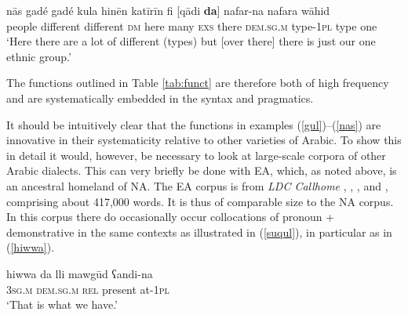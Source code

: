 \documentclass[output=paper]{langsci/langscibook}
\begin{document}
\ea\label{nas}
\gll nās gadé gadé kula hinēn katīrīn fi [qādi \textbf{da}] nafar-na nafara wāhid\\
     people different different \textsc{dm} here many \textsc{exs} there \textsc{dem.sg.m} type-\textsc{1pl} type one\\
\glt ‘Here there are a lot of different (types) but [over there] there is just our one ethnic group.’
\z

The functions outlined in Table \ref{tab:funct} are therefore both of high frequency and are systematically embedded in the syntax and pragmatics.

It should be intuitively clear that the functions in examples (\ref{gul})–(\ref{nas}) are innovative in their systematicity relative to other varieties of Arabic. To show this in detail it would, however, be necessary to look at large-scale corpora of other Arabic dialects. This can very briefly be done with EA, which, as noted above, is an ancestral homeland of NA. The EA corpus is from \textit{LDC Callhome} \citep{Canavanetal1997}, \citet{Nakano1982}, \citet{BehnstedtWoidich1987}, and \citet{WoidichDrop2007}, comprising about 417,000 words. It is thus of comparable size to the NA corpus. In this corpus there do occasionally occur collocations of pronoun + demonstrative in the same contexts as illustrated in (\ref{suqul}), in particular as in (\ref{hiwwa}). 

\ea\label{hiwwa} 
\gll hiwwa da lli mawgūd ʕandi-na\\
     \textsc{3sg.m} \textsc{dem.sg.m} \textsc{rel} present at-1\textsc{pl}\\
\glt ‘That is what we have.’
\z
\end{document}
